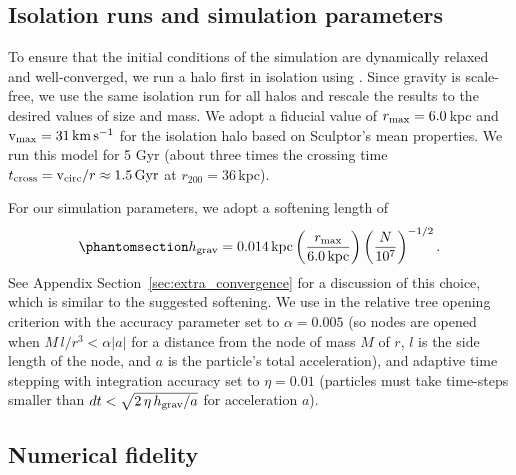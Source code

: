 \subsection{Isolation runs and simulation
parameters}\label{isolation-runs-and-simulation-parameters}

To ensure that the initial conditions of the simulation are dynamically
relaxed and well-converged, we run a halo first in isolation using
\gadget{}. Since gravity is scale-free, we use the same isolation run
for all halos and rescale the results to the desired values of size and
mass. We adopt a fiducial value of \(r_{\rm max} = 6.0\,\)kpc and
\({\rm v}_{\rm max} = 31\,{\rm km\,s^{-1}}\) for the isolation halo based on Sculptor's mean
properties. We run this model for 5 Gyr (about three times the crossing
time \(t_{\rm cross} = {\rm v}_{\rm circ} / r \approx 1.5\,{\rm Gyr}\) at
\(r_{200}=36\,\)kpc).

For our simulation parameters, we adopt a softening length of
\begin{equation}\protect\phantomsection\label{eq:softening_length}{
h_{\rm grav} = 0.014\,{\rm kpc}\left(\frac{r_{\rm max}}{6.0\,{\rm kpc}}\right)\left(\frac{N}{10^7}\right)^{-1/2}.
}\end{equation} See Appendix Section~\ref{sec:extra_convergence} for a
discussion of this choice, which is similar to the \citet{power+2003}
suggested softening. We use in \gadget{} the relative tree opening
criterion with the accuracy parameter set to \(\alpha =0.005\) (so nodes
are opened when \(M\,l/r^3 < \alpha |a|\) for a distance from the node
of mass \(M\) of \(r\), \(l\) is the side length of the node, and \(a\)
is the particle's total acceleration), and adaptive time stepping with
integration accuracy set to \(\eta=0.01\) (particles must take
time-steps smaller than \(dt < \sqrt{2\,\eta\,h_{\rm grav} / a}\) for
acceleration \(a\)).

\subsection{Numerical fidelity}\label{numerical-fidelity}

